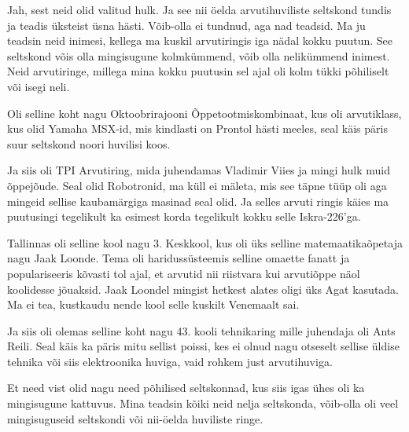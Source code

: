 
Jah, sest neid olid valitud hulk. Ja see nii öelda arvutihuviliste seltskond tundis ja teadis üksteist üsna hästi. Võib-olla ei tundnud, aga nad teadsid. Ma ju teadsin neid inimesi, kellega ma kuskil arvutiringis iga nädal kokku puutun. See seltskond võis olla mingisugune kolmkümmend, võib olla nelikümmend inimest. Neid arvutiringe,  millega mina kokku puutusin sel ajal oli kolm tükki põhiliselt või isegi neli. 

Oli selline koht nagu Oktoobrirajooni Õppetootmiskombinaat, kus oli arvutiklass, kus  olid Yamaha MSX-id, mis kindlasti on Prontol hästi meeles, seal käis päris suur seltskond noori huvilisi koos. 

Ja siis oli TPI Arvutiring, mida juhendamas Vladimir Viies ja mingi hulk muid õppejõude. Seal olid Robotronid, ma küll ei mäleta, mis see täpne tüüp oli aga mingeid  sellise kaubamärgiga masinad seal olid. Ja selles arvuti ringis käies ma puutusingi tegelikult ka esimest korda tegelikult kokku selle Iskra-226'ga.

Tallinnas oli selline kool nagu 3. Keskkool, kus oli üks selline matemaatikaõpetaja nagu Jaak Loonde. Tema oli haridussüsteemis selline omaette fanatt ja  populariseeris kõvasti tol ajal, et arvutid nii riistvara kui arvutiõppe näol koolidesse jõuaksid. Jaak Loondel  mingist hetkest alates oligi üks Agat kasutada. Ma ei tea, kustkaudu nende kool selle kuskilt Venemaalt sai. 

Ja siis oli olemas selline koht nagu 43. kooli tehnikaring mille juhendaja oli Ants Reili. Seal käis ka päris mitu sellist poissi, kes ei olnud nagu otseselt sellise üldise tehnika või siis elektroonika huviga, vaid rohkem  just arvutihuviga.

Et need vist olid nagu need põhilised seltskonnad, kus siis igas ühes oli  ka mingisugune kattuvus. Mina teadsin  kõiki neid nelja seltskonda, võib-olla oli veel mingisuguseid seltskondi või nii-öelda  huviliste ringe.


